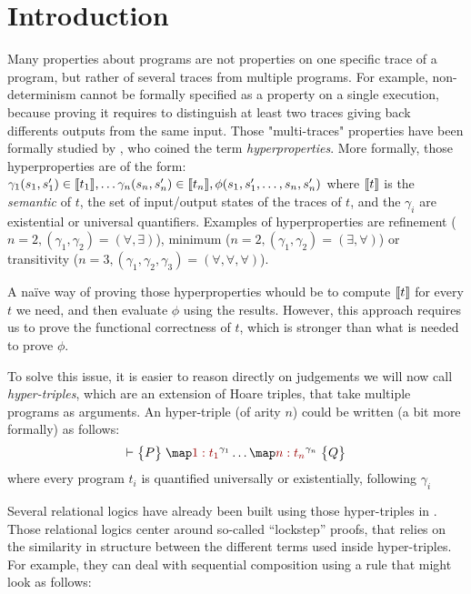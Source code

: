 \section{Introduction}
\label{sec:intro}

Many properties about programs are not properties on one specific trace of a program, but rather of several traces from multiple programs. For example, non-determinism cannot be formally specified as a property on a single execution, because proving it requires to distinguish at least two traces giving back differents outputs from the same input. Those "multi-traces" properties have been formally studied by \citet{ClarksonS08}, who coined the term \emph{hyperproperties}.
More formally, those hyperproperties are of the form:
\(
\gamma_1 (s_1, s'_1) \in \sem{t_1},
\dots
\gamma_n (s_n, s'_n) \in \sem{t_n},
\phi(s_1, s'_1, \dots, s_n, s'_n)
\)
where $\llbracket t\rrbracket$ is the \emph{semantic} of $t$, \ie the set of input/output states of the traces of $t$, and the $\gamma_i$ are existential or universal quantifiers. Examples of hyperproperties are refinement ($n = 2, (\gamma_1, \gamma_2) = (\forall, \exists)$), minimum ($n = 2, (\gamma_1, \gamma_2) = (\exists, \forall)$) or transitivity ($n = 3, (\gamma_1, \gamma_2, \gamma_3) = (\forall, \forall, \forall)$).

A naïve way of proving those hyperproperties whould be to compute $\llbracket t\rrbracket$ for every $t$ we need, and then evaluate $\phi$ using the results. However, this approach requires us to prove the functional correctness of $t$, which is stronger than what is needed to prove $\phi$.

To solve this issue, it is easier to reason directly on judgements we will now call \emph{hyper-triples}, which are an extension of Hoare triples, that take multiple programs as arguments. An hyper-triple (of arity $n$) could be written (a bit more formally) as follows:
\[
    \J |- {P} {\m[\I 1: t_1]^{\gamma_1} \dots \m[\I n: t_n]^{\gamma_n}} {Q}    
\]
where every program $t_i$ is quantified universally or existentially, following $\gamma_i$

Several relational logics have already been built using those hyper-triples in \cite{Yang07, SousaD16, Benton04, BartheCK16}. Those relational logics center around so-called ``lockstep'' proofs, that relies on the similarity in structure between the different terms used inside hyper-triples. For example, they can deal with sequential composition using a rule that might look as follows:

